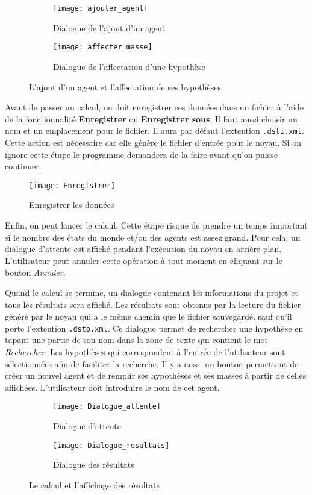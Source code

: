 \begin{figure}[H]
\begin{subfigure}{0.49\textwidth}
\texttt{[image: ajouter\_agent]}
\caption{Dialogue de l'ajout d'un agent}
\end{subfigure}
\hfill
\begin{subfigure}{0.49\textwidth}
\texttt{[image: affecter\_masse]}
\caption{Dialogue de l'affectation d'une hypothèse}
\end{subfigure}
\caption{L'ajout d'un agent et l'affectation de ses hypothèses}
\end{figure}

Avant de passer au calcul, on doit enregistrer ces données dans un fichier à l'aide de la fonctionnalité
\textbf{Enregistrer} ou \textbf{Enregistrer sous}. Il faut aussi choisir un nom et un emplacement pour le
fichier. Il aura par défaut l'extention \texttt{.dsti.xml}. Cette action est nécessaire car elle génère
le fichier d'entrée pour le noyau. Si on ignore cette étape le programme demandera de la faire avant qu'on
puisse continuer.\\[1em]

\begin{figure}[H]
\centering
\texttt{[image: Enregistrer]}
\caption{Enregistrer les données}
\end{figure}

Enfin, on peut lancer le calcul. Cette étape risque de prendre un temps important si le nombre des états
du monde et/ou des agents est assez grand. Pour cela, un dialogue d'attente est affiché pendant l'exécution
du noyau en arrière-plan. L'utilisateur peut annuler cette opération à tout moment en cliquant sur le bouton
\emph{Annuler}.

Quand le calcul se termine, un dialogue contenant les informations du projet et tous les résultats sera affiché.
Les résultats sont obtenus par la lecture du fichier généré par le noyau qui a le même chemin que le fichier
sauvegardé, sauf qu'il porte l'extention \texttt{.dsto.xml}. Ce dialogue permet de rechercher une hypothèse en
tapant une partie de son nom dans la zone de texte qui contient le mot \emph{Rechercher}.
Les hypothèses qui correspondent à l'entrée de l'utilisateur sont sélectionnées afin de faciliter
la recherche. Il y a aussi un bouton permettant de créer un nouvel agent et de remplir ses hypothèses et ses masses
à partir de celles affichées. L'utilisateur doit introduire le nom de cet agent.

\begin{figure}[H]
\begin{subfigure}{0.39\textwidth}
\texttt{[image: Dialogue\_attente]}
\caption{Dialogue d'attente}
\end{subfigure}
\hfill
\begin{subfigure}{0.59\textwidth}
\texttt{[image: Dialogue\_resultats]}
\caption{Dialogue des résultats}
\end{subfigure}
\caption{Le calcul et l'affichage des résultats}
\end{figure}

